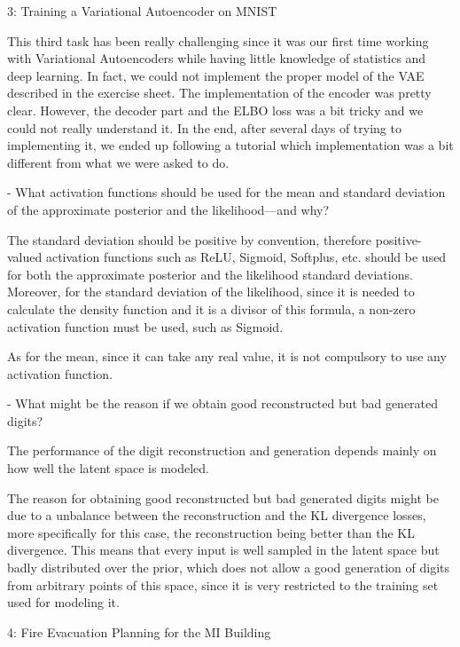 \documentclass[10pt,a4paper]{article}
\begin{document}
\newpage
\begin{task}{3: Training a Variational Autoencoder on MNIST}

\bigskip
This third task has been really challenging since it was our first time working with Variational Autoencoders while having little knowledge of statistics and deep learning. In fact, we could not implement the proper model of the VAE described in the exercise sheet. The implementation of the encoder was pretty clear. However, the decoder part and the ELBO loss was a bit tricky and we could not really understand it. In the end, after several days of trying to implementing it, we ended up following a tutorial which implementation was a bit different from what we were asked to do.

- What activation functions should be used for the mean and standard deviation of the approximate posterior and the likelihood—and why?

The standard deviation should be positive by convention, therefore positive-valued activation functions such as ReLU, Sigmoid, Softplus, etc. should be used for both the approximate posterior and the likelihood standard deviations. Moreover, for the standard deviation of the likelihood, since it is needed to calculate the density function and it is a divisor of this formula, a non-zero activation function must be used, such as Sigmoid.

As for the mean, since it can take any real value, it is not compulsory to use any activation function.

- What might be the reason if we obtain good reconstructed but bad generated digits?

The performance of the digit reconstruction and generation depends mainly on how well the latent space is modeled.

The reason for obtaining good reconstructed but bad generated digits might be due to a unbalance between the reconstruction and the KL divergence losses, more specifically for this case, the reconstruction being better than the KL divergence. This means that every input is well sampled in the latent space but badly distributed over the prior, which does not allow a good generation of digits from arbitrary points of this space, since it is very restricted to the training set used for modeling it.

\bigskip
\end{task}

\newpage
\begin{task}{4: Fire Evacuation Planning for the MI Building}

\bigskip
\end{task}

\newpage



\end{document}

